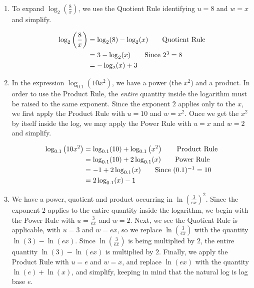 {
\begin{enumerate}


\item  To expand $\log_{2}\left(\frac{8}{x}\right)$, we use the Quotient Rule identifying $u = 8$ and $w=x$ and simplify.

\begin{align*}
\log_{2}\left(\dfrac{8}{x}\right) & =   \log_{2}(8) - \log_{2}(x) \tag*{Quotient Rule} \\
& =   3 - \log_{2}(x)  \tag*{Since $2^{3} = 8$} \\
& =  - \log_{2}(x) + 3  \\
\end{align*}

\item   In the expression $\log_{0.1} \left(10 x^2 \right)$, we have a power (the $x^2$) and a product.  In order to use the Product Rule, the \textit{entire} quantity inside the logarithm must be raised to the same exponent.  Since the exponent $2$ applies only to the $x$, we first apply the Product Rule with $u=10$ and $w=x^2$.  Once we get the $x^2$ by itself inside the log, we may apply the Power Rule with $u=x$ and $w=2$ and simplify. 

\begin{align*}
\log_{0.1} \left(10 x^2 \right) & =   \log_{0.1} (10) +  \log_{0.1} \left(x^2 \right) \tag*{Product Rule} \\                               
            & =   \log_{0.1} (10)+ 2 \log_{0.1} (x)  \tag*{Power Rule} \\
            & =   -1 + 2 \log_{0.1} (x)  \tag*{Since $(0.1)^{-1} = 10$} \\
            & =   2 \log_{0.1} (x) - 1  
\end{align*}


\item  We have a power, quotient and product occurring in $\ln \left(\frac{3}{ex}\right)^2$.  Since the exponent $2$ applies to the entire quantity inside the logarithm, we begin with the Power Rule with $u=\frac{3}{ex}$ and $w = 2$.  Next, we see the Quotient Rule is applicable, with $u=3$ and $w=ex$, so we replace $\ln\left(\frac{3}{ex}\right)$  with the quantity $\ln(3) - \ln(ex)$. Since $\ln \left(\frac{3}{ex}\right)$ is being multiplied by $2$, the entire quantity $\ln(3) - \ln(ex)$ is multiplied by $2$.  Finally, we apply the Product Rule with $u=e$ and $w=x$, and replace $\ln(ex)$ with the quantity $\ln(e) + \ln(x)$, and simplify, keeping in mind that the natural log is log base $e$.


\end{enumerate}}
